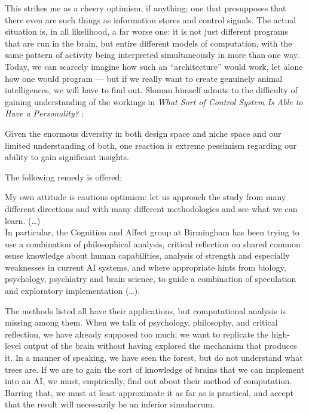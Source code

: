 This strikes me as a cheery optimism, if anything; one that presupposes that there even are such things as information stores and control signals. The actual situation is, in all likelihood, a far worse one: it is not just different programs that are run in the brain, but entire different models of computation, with the same pattern of activity being interpreted simultaneously in more than one way.
Today, we can scarcely imagine how such an ``architecture'' would work, let alone how one would program --- but if we really want to create genuinely animal intelligences, we will have to find out. Sloman himself admits to the difficulty of gaining understanding of the workings in {\em What Sort of Control System Is Able to Have a Personality?} \cite[p. 6, Section 9 ``Is the task too hard?'']{sloman1997}:
\begin{emquote}
Given the enormous diversity in both design space and niche space and our limited understanding of both, one reaction is extreme pessimism regarding our ability to gain significant insights.
\end{emquote}
The following remedy is offered:
\begin{emquote}
My own attitude is cautious optimism: let us approach the study from many different directions and with many different methodologies and see what we can learn. (\dots)\\
In particular, the Cognition and Affect group at Birmingham has been trying to use a combination of philosophical analysis, critical reflection on shared common sense knowledge about human capabilities, analysis of strength and especially weaknesses in current AI systems, and where appropriate hints from biology, psychology, psychiatry and brain science, to guide a combination of speculation and exploratory implementation (\dots).
\end{emquote}

The methods listed all have their applications, but computational analysis is missing among them. When we talk of psychology, philosophy, and critical reflection, we have already supposed too much; we want to replicate the high-level output of the brain without having explored the mechanism that produces it. In a manner of speaking, we have seen the forest, but do not understand what trees are. If we are to gain the sort of knowledge of brains that we can implement into an AI, we must, empirically, find out about their method of computation. Barring that, we must at least approximate it as far as is practical, and accept that the result will necessarily be an inferior simulacrum.

